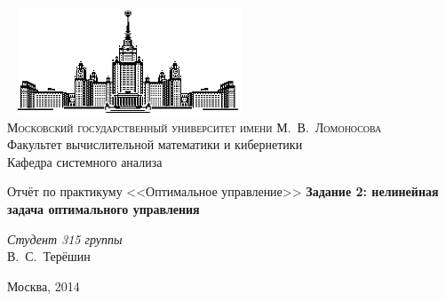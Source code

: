 \documentclass[11pt]{article}
\begin{document}
\thispagestyle{empty}

\begin{center}
\ \vspace{-3cm} \newline
\includegraphics[width=0.5\textwidth]{msu.eps}\\
{\scshape Московский государственный университет имени М.~В.~Ломоносова}\\
Факультет вычислительной математики и кибернетики\\
Кафедра системного анализа

\vfill

{\LARGE Отчёт по практикуму <<Оптимальное управление>>} \newline
{\Huge\bfseries Задание 2: нелинейная задача оптимального управления}
\end{center}

\vspace{1cm}
\begin{flushright}
\large
\textit{Студент 315 группы}\\
В.~С.~Терёшин\\
\end{flushright}

\vfill
\begin{center}
Москва, 2014
\end{center}
\pagebreak
\tableofcontents
\pagebreak
\end{document}
